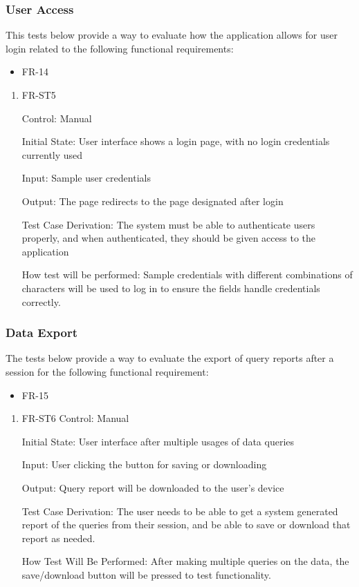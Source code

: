 \documentclass[12pt, titlepage]{article}
\begin{document}
          \subsubsection{User Access}
          This tests below provide a way to evaluate how the application allows for user login related to the following functional requirements:
          \begin{itemize}
            \item FR-14
          \end{itemize}
            \begin{enumerate}
            
              \item{FR-ST5}
              
              Control: Manual
                        
              Initial State: User interface shows a login page, with no login credentials currently used
                        
              Input: Sample user credentials
                        
              Output: The page redirects to the page designated after login
              
              Test Case Derivation: The system must be able to authenticate users properly, and when authenticated, they should be given access to the application
                        
              How test will be performed: Sample credentials with different combinations of characters will be used to log in to ensure the fields handle credentials correctly.  
              
              \end{enumerate}

  \subsubsection{Data Export}
  The tests below provide a way to evaluate the export of query reports after a session for the following functional requirement:
  \begin{itemize}
    \item FR-15
  \end{itemize}
  \begin{enumerate}
    \item{FR-ST6}
    Control: Manual

    Initial State: User interface after multiple usages of data queries

    Input: User clicking the button for saving or downloading

    Output: Query report will be downloaded to the user's device

    Test Case Derivation: The user needs to be able to get a system generated report of the queries from their session, and be able to save or download that report as needed.

    How Test Will Be Performed: After making multiple queries on the data, the save/download button will be pressed to test functionality.
  \end{enumerate}
\end{document}
